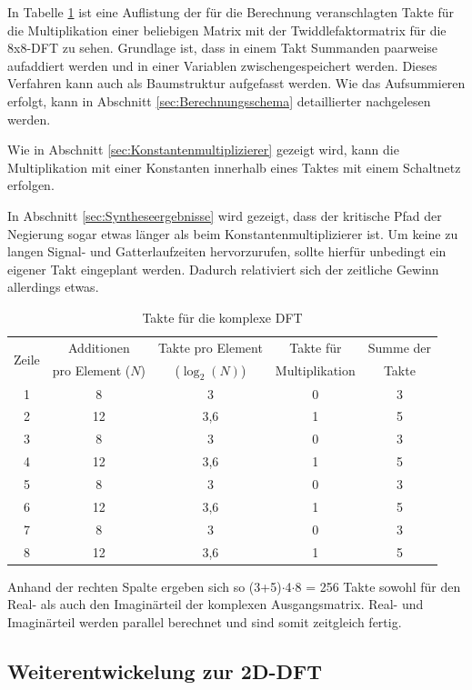 In Tabelle \ref{tab:TakteKomplexeDFT} ist eine Auflistung der für die Berechnung veranschlagten Takte für die Multiplikation einer beliebigen Matrix mit der
Twiddlefaktormatrix für die 8x8-DFT zu sehen. Grundlage ist, dass in einem Takt Summanden 
paarweise aufaddiert werden und in einer Variablen zwischengespeichert werden. Dieses Verfahren kann auch als Baumstruktur aufgefasst werden. 
Wie das Aufsummieren erfolgt, kann in Abschnitt \ref{sec:Berechnungsschema} detaillierter nachgelesen werden.

Wie in Abschnitt \ref{sec:Konstantenmultiplizierer} gezeigt wird, kann die Multiplikation mit einer Konstanten innerhalb eines Taktes mit einem Schaltnetz erfolgen. 

In Abschnitt \ref{sec:Syntheseergebnisse} wird gezeigt, dass der kritische Pfad der Negierung sogar etwas länger als beim Konstantenmultiplizierer ist.
Um keine zu langen Signal- und Gatterlaufzeiten hervorzurufen, sollte hierfür unbedingt ein eigener Takt eingeplant werden. Dadurch relativiert sich der zeitliche Gewinn allerdings 
etwas. 


\begin{table}[htbp]
\centering
\caption{Takte für die komplexe DFT}
\label{tab:TakteKomplexeDFT}
\begin{tabular}{ccccc}
\hline
\multirow{2}{*}{Zeile} & Additionen & Takte pro Element & Takte für & Summe der\\
      & pro Element ($N$) & ($\log_2(N)$) & Multiplikation & Takte\\
\hline
 1& 8  & 3   &0 &3\\
 2& 12 & 3,6 &1 &5\\
 3& 8  & 3   &0 &3\\
 4& 12 & 3,6 &1 &5\\
 5& 8  & 3   &0 &3\\
 6& 12 & 3,6 &1 &5\\
 7& 8  & 3   &0 &3\\
 8& 12 & 3,6 &1 &5\\
\hline
\end{tabular}
\end{table}

Anhand der rechten Spalte ergeben sich so (3+5)$\cdot$4$\cdot$8 = 256 Takte sowohl für den Real- als auch den Imaginärteil der komplexen Ausgangsmatrix. Real- und Imaginärteil
werden parallel berechnet und sind somit zeitgleich fertig.


\subsection{Weiterentwickelung zur 2D-DFT}

